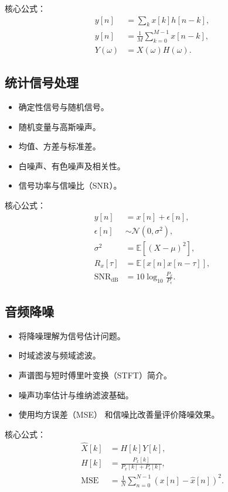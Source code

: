 \documentclass[12pt,fontset=none]{ctexart}
\begin{document}
核心公式：
\begin{align*}
y[n] &= \sum_k x[k]h[n-k],\\
y[n] &= \frac{1}{M}
\sum_{k=0}^{M-1}x[n-k],\\
Y(\omega) &= X(\omega)H(\omega).
\end{align*}

\subsection{统计信号处理}

\begin{itemize}
  \item 确定性信号与随机信号。
  \item 随机变量与高斯噪声。
  \item 均值、方差与标准差。
  \item 白噪声、有色噪声及相关性。
  \item 信号功率与信噪比（SNR）。
\end{itemize}

核心公式：
\begin{align*}
y[n] &= x[n]+\epsilon[n],\\
\epsilon[n] &\sim \mathcal{N}(0,\sigma^2),\\
\sigma^2 &= \mathbb{E}[(X-\mu)^2],\\
R_x[\tau] &= \mathbb{E}[x[n]x[n-\tau]],\\
\mathrm{SNR}_{\mathrm{dB}}
&=10\log_{10}\frac{P_x}{P_\epsilon}.
\end{align*}

\subsection{音频降噪}

\begin{itemize}
  \item 将降噪理解为信号估计问题。
  \item 时域滤波与频域滤波。
  \item 声谱图与短时傅里叶变换（STFT）简介。
  \item 噪声功率估计与维纳滤波基础。
  \item 使用均方误差（MSE）
  和信噪比改善量评价降噪效果。
\end{itemize}

核心公式：
\begin{align*}
\hat X[k] &= H[k]Y[k],\\
H[k] &= \frac{P_x[k]}{P_x[k]+P_\epsilon[k]},\\
\mathrm{MSE}
&= \frac{1}{N}\sum_{n=0}^{N-1}
(x[n]-\hat x[n])^2.
\end{align*}
\end{document}
